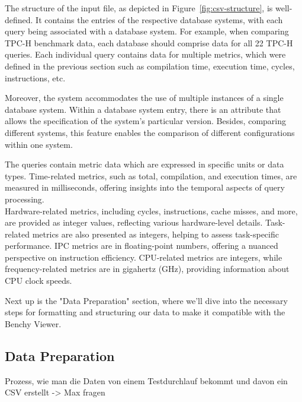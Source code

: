 \noindent

The structure of the input file, as depicted in Figure~\ref{fig:csv-structure}, is well-defined. It contains the entries of the respective database systems, with each query being associated with a database system. For example, when comparing TPC-H benchmark data, each database should comprise data for all 22 TPC-H queries. Each individual query contains data for multiple metrics, which were defined in the previous section such as compilation time, execution time, cycles, instructions, etc.

Moreover, the system accommodates the use of multiple instances of a single database system. Within a database system entry, there is an attribute that allows the specification of the system's particular version. Besides, comparing different systems, this feature enables the comparison of different configurations within one system.

The queries contain metric data  which are expressed in specific units or data types. Time-related metrics, such as total, compilation, and execution times, are measured in milliseconds, offering insights into the temporal aspects of query processing.\\
Hardware-related metrics, including cycles, instructions, cache misses, and more, are provided as integer values, reflecting various hardware-level details. Task-related metrics are also presented as integers, helping to assess task-specific performance. IPC metrics are in floating-point numbers, offering a nuanced perspective on instruction efficiency. CPU-related metrics are integers, while frequency-related metrics are in gigahertz (GHz), providing information about CPU clock speeds.

Next up is the "Data Preparation" section, where we'll dive into the necessary steps for formatting and structuring our data to make it compatible with the Benchy Viewer.

\subsection{Data Preparation}
Prozess, wie man die Daten von einem Testdurchlauf bekommt und davon ein CSV erstellt
-> Max fragen

